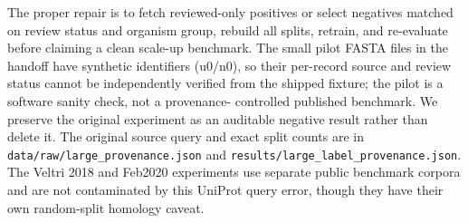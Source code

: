The proper repair is to fetch reviewed-only positives or select negatives
matched on review status and organism group, rebuild all splits, retrain,
and re-evaluate before claiming a clean scale-up benchmark. The small pilot
FASTA files in the handoff have synthetic identifiers (u0/n0), so their
per-record source and review status cannot be independently verified from
the shipped fixture; the pilot is a software sanity check, not a provenance-
controlled published benchmark. We preserve the
original experiment as an auditable negative result rather than delete it.
The original source query and exact split counts are in
\texttt{data/raw/large\_provenance.json} and
\texttt{results/large\_label\_provenance.json}. The Veltri 2018 and
Feb2020 experiments use separate public benchmark corpora and are not
contaminated by this UniProt query error, though they have their own
random-split homology caveat.
